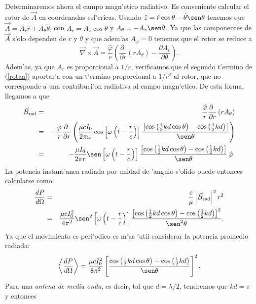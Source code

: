Determinaremos ahora el campo magn'etico radiativo. Es conveniente calcular el rotor de $\vec{A}$ en coordenadas esf'ericas. Usando $\hat{z}=\hat{r}\cos\theta-\hat{\theta}\sen\theta$
tenemos que $\vec{A}=A_r\hat{r}+A_\theta\hat{\theta}$, con $A_r=A_z\cos\theta$ y $A_\theta=-A_z\sen\theta$. Ya que las componentes de $\vec{A}$ s'olo dependen de $r$ y $\theta$ y que adem'as $A_\varphi=0$ tenemos que el rotor se reduce a
\begin{equation}
 \vec{\nabla}\times\vec{A}=\frac{\hat{\varphi}}{r}\left(\frac{\partial\ }{\partial r}\left(rA_\theta\right)-\frac{\partial A_r}{\partial\theta}\right). \label{rotaa}
\end{equation}
Adem'as, ya que $A_r$ es proporcional a $1/r$, verificamos que el segundo t'ermino de (\ref{rotaa}) aportar'a con un t'ermino proporcional a $1/r^2$ al rotor, que no corresponde a una contribuci'on radiativa al campo magn'etico. De esta forma, llegamos a que
\begin{eqnarray}
 \vec{B}_{\rm rad}&=&\frac{\hat{\varphi}}{r}\frac{\partial\ }{\partial r}\left(rA_\theta\right) \\
&=&-\frac{\hat{\varphi}}{r}\frac{\partial\ }{\partial r}\left(\frac{\mu cI_0}{2\pi\omega}\cos\left[\omega\left(t-\frac{r}{c}\right)\right]\frac{\left[\cos\left(\frac{1}{2}kd\cos\theta\right)-\cos\left(\frac{1}{2}kd\right)\right]}{\sen\theta}\right) \\
&=&-\frac{\mu I_0}{2\pi r}\sen\left[\omega\left(t-\frac{r}{c}\right)\right]\frac{\left[\cos\left(\frac{1}{2}kd\cos\theta\right)-\cos\left(\frac{1}{2}kd\right)\right]}{\sen\theta}\,\hat{\varphi}.
\end{eqnarray}
La potencia instant'anea radiada por unidad de 'angulo s'olido puede entonces calcularse como:
\begin{eqnarray}
 \frac{dP}{d\Omega}&=&\frac{c}{\mu}\left|\vec{B}_{\rm rad}\right|^2 r^2\\
&=&\frac{\mu c I_0^2}{4\pi^2}\sen^2\left[\omega\left(t-\frac{r}{c}\right)\right]\frac{\left[\cos\left(\frac{1}{2}kd\cos\theta\right)-\cos\left(\frac{1}{2}kd\right)\right]^2}{\sen^2\theta}.
\end{eqnarray}
Ya que el movimiento es peri'odico es m'as 'util considerar la potencia promedio radiada:
\begin{equation}
 \left\langle\frac{dP}{d\Omega}\right\rangle=\frac{\mu cI_0^2}{8\pi^2}\left[\frac{\cos\left(\frac{1}{2}kd\cos\theta\right)-\cos\left(\frac{1}{2}kd\right)}{\sen\theta}\right]^2.
\end{equation}
Para una \textit{antena de media onda}, es decir, tal que $d=\lambda/2$, tendremos que $kd=\pi$ y entonces
